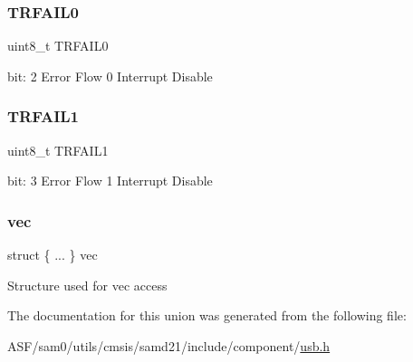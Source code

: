 \subsubsection{\texorpdfstring{TRFAIL0}{TRFAIL0}}
{\footnotesize\ttfamily uint8\+\_\+t T\+R\+F\+A\+I\+L0}

bit\+: 2 Error Flow 0 Interrupt Disable \mbox{\label{union_u_s_b___d_e_v_i_c_e___e_p_i_n_t_e_n_c_l_r___type_a25eefecf91be8facebc4c383e2339b9b}} 
\subsubsection{\texorpdfstring{TRFAIL1}{TRFAIL1}}
{\footnotesize\ttfamily uint8\+\_\+t T\+R\+F\+A\+I\+L1}

bit\+: 3 Error Flow 1 Interrupt Disable \mbox{\label{union_u_s_b___d_e_v_i_c_e___e_p_i_n_t_e_n_c_l_r___type_ac0b2a6fcd79f3699ae40fb763101194f}} 
\subsubsection{\texorpdfstring{vec}{vec}}
{\footnotesize\ttfamily struct \{ ... \}   vec}

Structure used for vec access 

The documentation for this union was generated from the following file\+:\begin{DoxyCompactItemize}
\item 
A\+S\+F/sam0/utils/cmsis/samd21/include/component/\mbox{\hyperlink{component_2usb_8h}{usb.\+h}}\end{DoxyCompactItemize}
